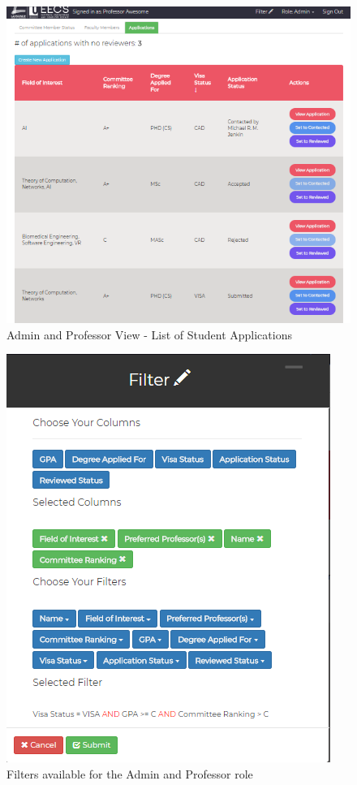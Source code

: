 \documentclass[fontsize=12pt,paper=letter,twoside]{scrartcl}
\begin{document}
\begin{figure}[!htb]
\begin{center}
\includegraphics[width=.99\textwidth]{images/admin_prof_view.png}
\end{center}
\caption{Admin and Professor View - List of Student Applications}
\label{fig:admin_prof_view}
\end{figure}

\begin{figure}[!htb]
\begin{center}
\includegraphics[width=.78\textwidth]{images/admin_prof_filter.png}
\end{center}
\caption{Filters available for the Admin and Professor role}
\label{fig:admin_prof_filter}
\end{figure}
\end{document}
